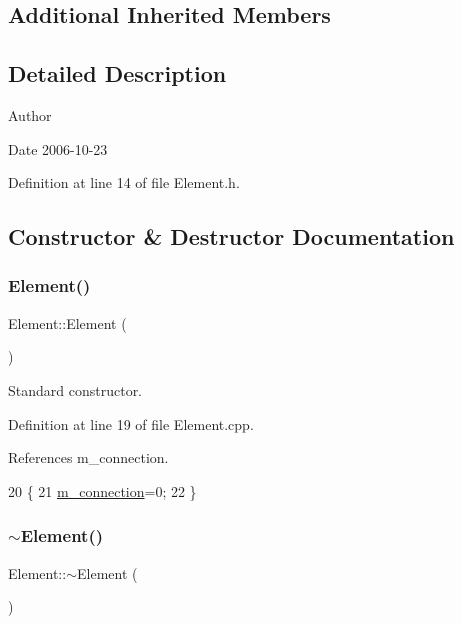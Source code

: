 \subsection*{Additional Inherited Members}


\subsection{Detailed Description}
\begin{DoxyAuthor}{Author}

\end{DoxyAuthor}
\begin{DoxyDate}{Date}
2006-\/10-\/23 
\end{DoxyDate}


Definition at line 14 of file Element.\+h.



\subsection{Constructor \& Destructor Documentation}
\mbox{\label{classElement_ab0d0e20be9a36ae676202db753faeec9}} 
\subsubsection{\texorpdfstring{Element()}{Element()}}
{\footnotesize\ttfamily Element\+::\+Element (\begin{DoxyParamCaption}{ }\end{DoxyParamCaption})}



Standard constructor. 



Definition at line 19 of file Element.\+cpp.



References m\+\_\+connection.


\begin{DoxyCode}
20 \{
21   \hyperlink{classElement_abe3de7a5dbbc9a6dd2d7e012e5fdb266}{m\_connection}=0;
22 \}
\end{DoxyCode}
\mbox{\label{classElement_a13d54ba9c08b6bec651402f1c2bb002c}} 
\subsubsection{\texorpdfstring{$\sim$\+Element()}{~Element()}}
{\footnotesize\ttfamily Element\+::$\sim$\+Element (\begin{DoxyParamCaption}{ }\end{DoxyParamCaption})\hspace{0.3cm}{\ttfamily [virtual]}}




